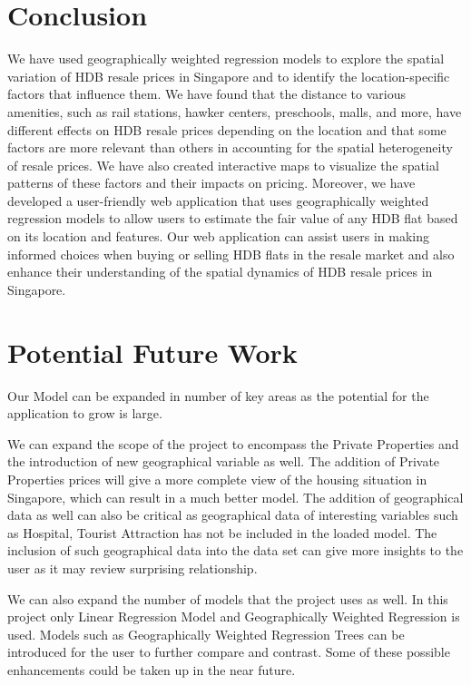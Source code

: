 \documentclass[manuscript,screen]{acmart}
\begin{document}
\hypertarget{conclusion}{%
\section{\texorpdfstring{\textbf{Conclusion}}{Conclusion}}\label{conclusion}}

We have used geographically weighted regression models to explore the
spatial variation of HDB resale prices in Singapore and to identify the
location-specific factors that influence them. We have found that the
distance to various amenities, such as rail stations, hawker centers,
preschools, malls, and more, have different effects on HDB resale prices
depending on the location and that some factors are more relevant than
others in accounting for the spatial heterogeneity of resale prices. We
have also created interactive maps to visualize the spatial patterns of
these factors and their impacts on pricing. Moreover, we have developed
a user-friendly web application that uses geographically weighted
regression models to allow users to estimate the fair value of any HDB
flat based on its location and features. Our web application can assist
users in making informed choices when buying or selling HDB flats in the
resale market and also enhance their understanding of the spatial
dynamics of HDB resale prices in Singapore.

\hypertarget{potential-future-work}{%
\section{\texorpdfstring{\textbf{Potential Future
Work}}{Potential Future Work}}\label{potential-future-work}}

Our Model can be expanded in number of key areas as the potential for
the application to grow is large.

We can expand the scope of the project to encompass the Private
Properties and the introduction of new geographical variable as well.
The addition of Private Properties prices will give a more complete view
of the housing situation in Singapore, which can result in a much better
model. The addition of geographical data as well can also be critical as
geographical data of interesting variables such as Hospital, Tourist
Attraction has not be included in the loaded model. The inclusion of
such geographical data into the data set can give more insights to the
user as it may review surprising relationship.

We can also expand the number of models that the project uses as well.
In this project only Linear Regression Model and Geographically Weighted
Regression is used. Models such as Geographically Weighted Regression
Trees can be introduced for the user to further compare and contrast.
Some of these possible enhancements could be taken up in the near
future.
\end{document}

